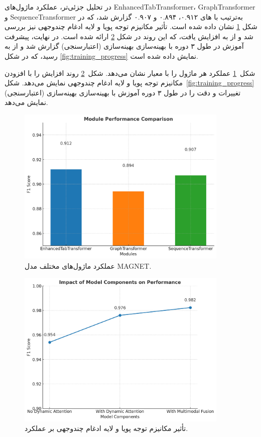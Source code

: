در تحلیل جزئی‌تر، عملکرد ماژول‌های EnhancedTabTransformer، GraphTransformer و SequenceTransformer به‌ترتیب با های ۰.۹۱۲، ۰.۸۹۴ و ۰.۹۰۷ گزارش شد، که در شکل \ref{fig:module_comparison} نشان داده شده است. تأثیر مکانیزم توجه پویا و لایه ادغام چندوجهی نیز بررسی شد و  از  به  افزایش یافت، که این روند در شکل \ref{fig:ablation_study} ارائه شده است. در نهایت، پیشرفت آموزش در طول ۳ دوره با بهینه‌سازی بهینه‌سازی (اعتبارسنجی) گزارش شد و  از  به  رسید، که در شکل \ref{fig:training_progress} نمایش داده شده است.

شکل~\ref{fig:module_comparison} عملکرد هر ماژول را با معیار  نشان می‌دهد. شکل~\ref{fig:ablation_study} روند افزایش  را با افزودن مکانیزم توجه پویا و لایه ادغام چندوجهی نمایش می‌دهد. شکل~\ref{fig:training_progress} تغییرات  و دقت را در طول ۳ دوره آموزش با بهینه‌سازی بهینه‌سازی (اعتبارسنجی) نمایش می‌دهد.

\begin{figure}[h!]
\centering
\includegraphics[width=0.9\textwidth]{images/fig_module_comparison_en}
    \caption{عملکرد ماژول‌های مختلف مدل MAGNET.}
\label{fig:module_comparison}
\end{figure}

\begin{figure}[h!]
\centering
\includegraphics[width=0.9\textwidth]{images/fig_ablation_study_en}
    \caption{تأثیر مکانیزم توجه پویا و لایه ادغام چندوجهی بر عملکرد.}
\label{fig:ablation_study}
\end{figure}

